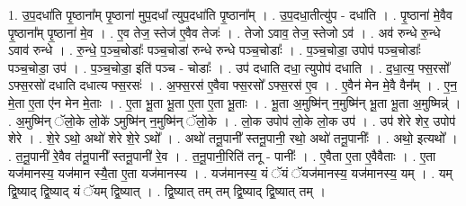\documentclass[17pt]{extarticle}
\begin{document}
1. उ॒प॒दधा॑ति पृ॒ष्ठाना᳚म् पृ॒ष्ठाना॑ मुप॒दधा᳚ त्युप॒दधा॑ति पृ॒ष्ठाना᳚म् । . उ॒प॒दधा॒तीत्यु॑प - दधा॑ति । . पृ॒ष्ठाना॑ मे॒वैव पृ॒ष्ठाना᳚म् पृ॒ष्ठाना॑ मे॒व । . ए॒व तेज॒ स्तेज॑ ए॒वैव तेजः॑ । . तेजो ऽवाव॒ तेज॒ स्तेजो ऽव॑ । . अव॑ रुन्धे रु॒न्धे ऽवाव॑ रुन्धे । . रु॒न्धे॒ प॒ञ्च॒चोडाः᳚ पञ्च॒चोडा॑ रुन्धे रुन्धे पञ्च॒चोडाः᳚ । . प॒ञ्च॒चोडा॒ उपोप॑ पञ्च॒चोडाः᳚ पञ्च॒चोडा॒ उप॑ । . प॒ञ्च॒चोडा॒ इति॑ पञ्च - चोडाः᳚ । . उप॑ दधाति दधा॒ त्युपोप॑ दधाति । . द॒धा॒त्य॒ फ्स॒रसो᳚ ऽफ्स॒रसो॑ दधाति दधात्य फ्स॒रसः॑ । . अ॒फ्स॒रस॑ ए॒वैवा फ्स॒रसो᳚ ऽफ्स॒रस॑ ए॒व । . ए॒वैन॑ मेन मे॒वै वैन᳚म् । . ए॒न॒ मे॒ता ए॒ता ए॑न मेन मे॒ताः । . ए॒ता भू॒ता भू॒ता ए॒ता ए॒ता भू॒ताः । . भू॒ता अ॒मुष्मि॑न् न॒मुष्मि॑न् भू॒ता भू॒ता अ॒मुष्मिन्न्॑ । . अ॒मुष्मि॑न् ॅलो॒के लो॒के॑ ऽमुष्मि॑न् न॒मुष्मि॑न् ॅलो॒के । . लो॒क उपोप॑ लो॒के लो॒क उप॑ । . उप॑ शेरे शेर॒ उपोप॑ शेरे । . शे॒रे ऽथो॒ अथो॑ शेरे शे॒रे ऽथो᳚ । . अथो॑ तनू॒पानी᳚ स्तनू॒पानी॒ रथो॒ अथो॑ तनू॒पानीः᳚ । . अथो॒ इत्यथो᳚ । . त॒नू॒पानी॑ रे॒वैव त॑नू॒पानी᳚ स्तनू॒पानी॑ रे॒व । . त॒नू॒पानी॒रिति॑ तनू - पानीः᳚ । . ए॒वैता ए॒ता ए॒वैवैताः । . ए॒ता यज॑मानस्य॒ यज॑मान स्यै॒ता ए॒ता यज॑मानस्य । . यज॑मानस्य॒ यं ॅयं ॅयज॑मानस्य॒ यज॑मानस्य॒ यम् । . यम् द्वि॒ष्याद् द्वि॒ष्याद् यं ॅयम् द्वि॒ष्यात् । . द्वि॒ष्यात् तम् तम् द्वि॒ष्याद् द्वि॒ष्यात् तम् । \newline
\end{document}
